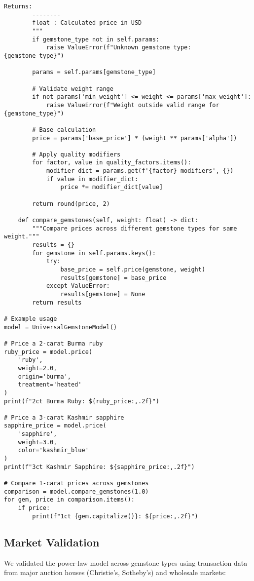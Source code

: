 \begin{lstlisting}[caption={Multi-Gemstone Power-Law Implementation}]
        Returns:
        --------
        float : Calculated price in USD
        """
        if gemstone_type not in self.params:
            raise ValueError(f"Unknown gemstone type: {gemstone_type}")
        
        params = self.params[gemstone_type]
        
        # Validate weight range
        if not params['min_weight'] <= weight <= params['max_weight']:
            raise ValueError(f"Weight outside valid range for {gemstone_type}")
        
        # Base calculation
        price = params['base_price'] * (weight ** params['alpha'])
        
        # Apply quality modifiers
        for factor, value in quality_factors.items():
            modifier_dict = params.get(f'{factor}_modifiers', {})
            if value in modifier_dict:
                price *= modifier_dict[value]
        
        return round(price, 2)
    
    def compare_gemstones(self, weight: float) -> dict:
        """Compare prices across different gemstone types for same weight."""
        results = {}
        for gemstone in self.params.keys():
            try:
                base_price = self.price(gemstone, weight)
                results[gemstone] = base_price
            except ValueError:
                results[gemstone] = None
        return results

# Example usage
model = UniversalGemstoneModel()

# Price a 2-carat Burma ruby
ruby_price = model.price(
    'ruby',
    weight=2.0,
    origin='burma',
    treatment='heated'
)
print(f"2ct Burma Ruby: ${ruby_price:,.2f}")

# Price a 3-carat Kashmir sapphire
sapphire_price = model.price(
    'sapphire',
    weight=3.0,
    color='kashmir_blue'
)
print(f"3ct Kashmir Sapphire: ${sapphire_price:,.2f}")

# Compare 1-carat prices across gemstones
comparison = model.compare_gemstones(1.0)
for gem, price in comparison.items():
    if price:
        print(f"1ct {gem.capitalize()}: ${price:,.2f}")
\end{lstlisting}

\subsection{Market Validation}

We validated the power-law model across gemstone types using transaction data from major auction houses (Christie's, Sotheby's) and wholesale markets:

